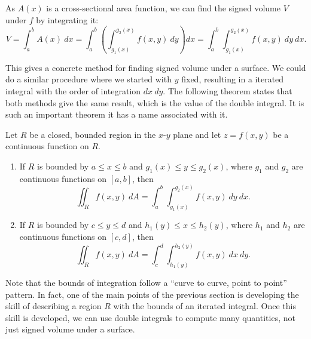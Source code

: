 
As $A(x)$ is a cross-sectional area function, we can find the signed volume $V$ under $f$ by integrating it:
\[
V = \int_a^b A(x)\ dx = \int_a^b\left(\int_{g_1(x)}^{g_2(x)} f(x,y)\ dy\right)dx
= \int_a^b\int_{g_1(x)}^{g_2(x)} f(x,y)\ dy\ dx.
\]

This gives a concrete method for finding signed volume under a surface. We could do a similar procedure where we started with $y$ fixed, resulting in a iterated integral with the order of integration $dx\ dy$. The following theorem states that both methods give the same result, which is the value of the double integral. It is such an important theorem it has a name associated with it.

\begin{theorem}\label{thm:fubini}
Let $R$ be a closed, bounded region in the $x$-$y$ plane and let $z=f(x,y)$ be a continuous function on $R$.%
\begin{enumerate}
	\item If $R$ is bounded by $a\leq x\leq b$ and $g_1(x)\leq y\leq g_2(x)$, where $g_1$ and $g_2$ are continuous functions on $[a,b]$, then
	\[\iint_R f(x,y)\ dA = \int_a^b\int_{g_1(x)}^{g_2(x)} f(x,y)\ dy\ dx.\]
	
	\item If $R$ is bounded by $c\leq y\leq d$ and $h_1(y)\leq x\leq h_2(y)$, where $h_1$ and $h_2$ are continuous functions on $[c,d]$, then
	\[\iint_R f(x,y)\ dA = \int_c^d\int_{h_1(y)}^{h_2(y)} f(x,y)\ dx\ dy.\]
\end{enumerate}
\end{theorem}

Note that the bounds of integration follow a ``curve to curve, point to point'' pattern. In fact, one of the main points of the previous section is developing the skill of describing a region $R$ with the bounds of an iterated integral. Once this skill is developed, we can use double integrals to compute many quantities, not just signed volume under a surface.

